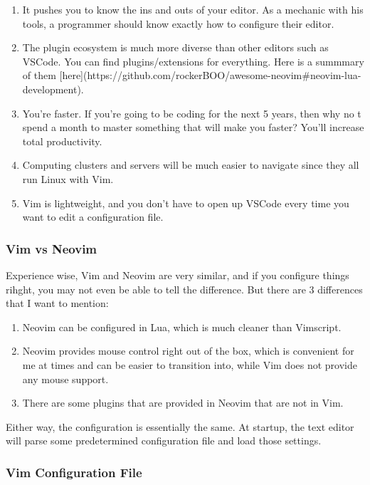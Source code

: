 \documentclass{article}
\begin{document}
    \begin{enumerate}
      \item It pushes you to know the ins and outs of your editor. As a mechanic with his tools, a programmer should know exactly how to configure their editor.  
      \item The plugin ecosystem is much more diverse than other editors such as VSCode. You can find plugins/extensions for everything. Here is a summmary of them [here](https://github.com/rockerBOO/awesome-neovim\#neovim-lua-development). 
      \item You're faster. If you're going to be coding for the next 5 years, then why no t spend a month to master something that will make you faster? You'll increase total productivity. 
      \item Computing clusters and servers will be much easier to navigate since they all run Linux with Vim. 
      \item Vim is lightweight, and you don't have to open up VSCode every time you want to edit a configuration file.  
    \end{enumerate}
  
    \subsubsection{Vim vs Neovim}

      Experience wise, Vim and Neovim are very similar, and if you configure things rihght, you may not even be able to tell the difference. But there are 3 differences that I want to mention: 
      
      \begin{enumerate}
        \item Neovim can be configured in Lua, which is much cleaner than Vimscript. 
        \item Neovim provides mouse control right out of the box, which is convenient for me at times and can be easier to transition into, while Vim does not provide any mouse support. 
        \item There are some plugins that are provided in Neovim that are not in Vim. 
      \end{enumerate}

      Either way, the configuration is essentially the same. At startup, the text editor will parse some predetermined configuration file and load those settings. 

    \subsubsection{Vim Configuration File}
\end{document}
